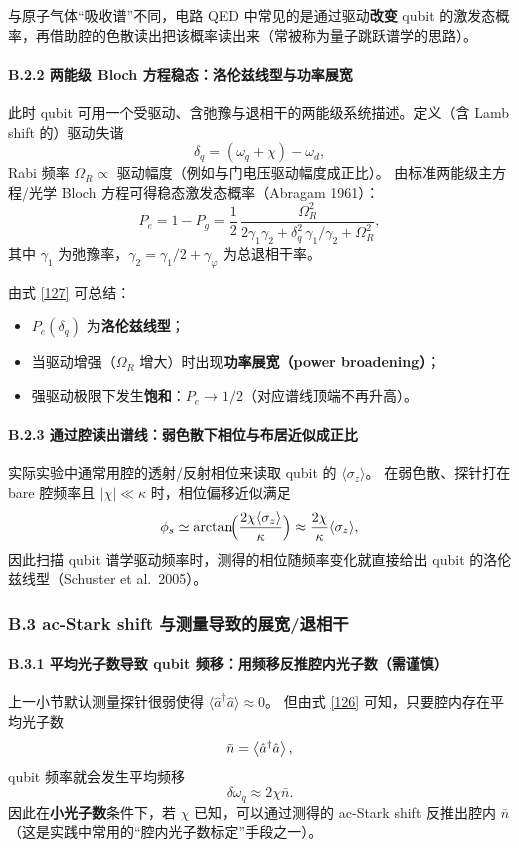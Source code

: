 \documentclass[12pt,a4paper,oneside]{ctexbook}
\let\oldparagraph\paragraph
\renewcommand{\paragraph}[1]{\oldparagraph{#1}\mbox{}}
\begin{document}
与原子气体“吸收谱”不同，电路 QED 中常见的是通过驱动\textbf{改变} qubit 的激发态概率，再借助腔的色散读出把该概率读出来（常被称为量子跳跃谱学的思路）。

\paragraph{B.2.2 两能级 Bloch 方程稳态：洛伦兹线型与功率展宽}
此时 qubit 可用一个受驱动、含弛豫与退相干的两能级系统描述。定义（含 Lamb shift 的）驱动失谐
\[
\delta_q = (\omega_q+\chi)-\omega_d,
\]
Rabi 频率 $\Omega_R \propto$ 驱动幅度（例如与门电压驱动幅度成正比）。
由标准两能级主方程/光学 Bloch 方程可得稳态激发态概率（Abragam 1961）：
\begin{equation}
P_e
=
1-P_g
=
\frac{1}{2}\,
\frac{\Omega_R^2}{
2\gamma_1\gamma_2+\delta_q^2\,\gamma_1/\gamma_2+\Omega_R^2},
\tag{127}
\end{equation}
其中 $\gamma_1$ 为弛豫率，$\gamma_2=\gamma_1/2+\gamma_\varphi$ 为总退相干率。

由式 \eqref{127} 可总结：
\begin{itemize}
  \item $P_e(\delta_q)$ 为\textbf{洛伦兹线型}；
  \item 当驱动增强（$\Omega_R$ 增大）时出现\textbf{功率展宽（power broadening）}；
  \item 强驱动极限下发生\textbf{饱和}：$P_e\to 1/2$（对应谱线顶端不再升高）。
\end{itemize}

\paragraph{B.2.3 通过腔读出谱线：弱色散下相位与布居近似成正比}
实际实验中通常用腔的透射/反射相位来读取 qubit 的 $\langle\sigma_z\rangle$。
在弱色散、探针打在 bare 腔频率且 $|\chi|\ll\kappa$ 时，相位偏移近似满足
\[
\phi_s \simeq \arctan\!\Bigl(\frac{2\chi\langle\sigma_z\rangle}{\kappa}\Bigr)
\approx \frac{2\chi}{\kappa}\langle\sigma_z\rangle,
\]
因此扫描 qubit 谱学驱动频率时，测得的相位随频率变化就直接给出 qubit 的洛伦兹线型（Schuster et al.\ 2005）。

\subsubsection{B.3 ac-Stark shift 与测量导致的展宽/退相干}

\paragraph{B.3.1 平均光子数导致 qubit 频移：用频移反推腔内光子数（需谨慎）}
上一小节默认测量探针很弱使得 $\langle \hat a^\dagger \hat a\rangle \approx 0$。
但由式 \eqref{126} 可知，只要腔内存在平均光子数
\[
\bar n=\expval{\hat a^\dagger \hat a},
\]
qubit 频率就会发生平均频移
\[
\delta\omega_q \approx 2\chi \bar n.
\]
因此在\textbf{小光子数}条件下，若 $\chi$ 已知，可以通过测得的 ac-Stark shift 反推出腔内 $\bar n$（这是实践中常用的“腔内光子数标定”手段之一）。
\end{document}

